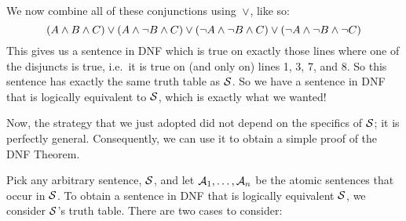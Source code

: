 We now combine all of these conjunctions using~$\vee$, like so:
$$(A \wedge B \wedge C) \vee (A \wedge \neg B \wedge C) \vee (\neg A \wedge \neg B \wedge C) \vee (\neg A \wedge \neg B \wedge \neg C)$$\label{longDNF}
This gives us a sentence in DNF which is true on exactly those lines where one of the disjuncts is true, i.e.\ it is true on (and only on) lines 1, 3, 7, and 8. So this sentence has exactly the same truth table as $\mathcal{S}$. So we have a sentence in DNF that is logically equivalent to $\mathcal{S}$, which is exactly what we wanted!

Now, the strategy that we just adopted did not depend on the specifics of $\mathcal{S}$; it is perfectly general. Consequently, we can use it to obtain a simple proof of the DNF Theorem.

Pick any arbitrary sentence, $\mathcal{S}$, and let $\mathcal{A}_1, \ldots, \mathcal{A}_n$ be the atomic sentences that occur in $\mathcal{S}$. To obtain a sentence in DNF that is logically equivalent $\mathcal{S}$, we consider $\mathcal{S}$'s truth table. There are two cases to consider:
